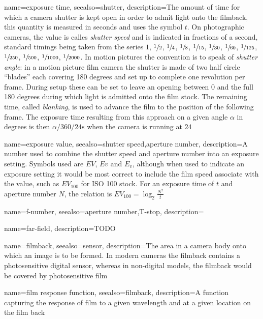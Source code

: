 {
	name={exposure time},
	seealso={shutter},
	description={The amount of time for which a camera shutter is kept open in order to
		admit light onto the filmback, this quantity is measured in seconds and uses the
		symbol $t$. 
		On photographic cameras, the value is calles \textsl{shutter speed} and is 
		indicated in fractions of a second, standard timings being
		taken from the series $1$, $\sfrac12$, $\sfrac14$, $\sfrac18$, 
		$\sfrac1{15}$, $\sfrac1{30}$, $\sfrac1{60}$, $\sfrac1{125}$, 
		$\sfrac1{250}$, $\sfrac1{500}$, $\sfrac1{1000}$, $\sfrac1{2000}$.
		In motion pictures the convention is to speak of \textsl{shutter angle}:
		in a motion picture film camera the shutter is made of two half circle ``blades'' 
		each covering 180 degrees and set up to complete one revolution per frame. 
		During setup these can be set to leave an opening between 0 and the
		full 180 degrees during which light is admitted onto the film stock.
		The remaining time, called \textsl{blanking}, is used to advance the film
		to the position of the following frame. The exposure time resulting from this 
		approach on a given angle $\alpha$ in degrees is then $\alpha/360/24 \unit{\second}$
		when the camera is running at $24$ }
}

{
	name={exposure value},
	seealso={shutter speed,aperture number},
	description={A number used to combine the shutter speed and aperture number into an
		exposure setting. 
		Symbols used are $EV$, $Ev$ and $E_v$, although when used to indicate an exposure 
		setting it would be most correct to include the film speed associate with the value, 
		such as $EV_{100}$ for ISO 100 stock.
		For an exposure time of $t$ and aperture number $N$, the relation is
		$EV_{100} = \log_2\frac{N^2}{t}$}
}

{
	name={f-number},
	seealso={aperture number,T-stop},
	description=\nopostdesc
}

{
	name={far-field},
	description={TODO}
}


{
	name=filmback,
	seealso={sensor},
	description={The area in a camera body onto which an image is to be formed. 
		In modern cameras the filmback contains a photosensitive digital sensor,
		whereas in non-digital models, the filmback would be covered by 
		photosensitive film}
}

{
	name={film response function},
	seealso={filmback},
	description={A function capturing the response of film to a given wavelength and at a
		given location on the film back}
}

